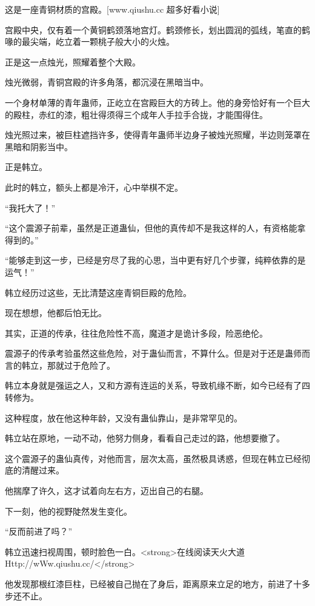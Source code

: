 
\begin{this_body}

这是一座青铜材质的宫殿。[www.qiushu.cc 超多好看小说]

宫殿中央，仅有着一个黄铜鹤颈落地宫灯。鹤颈修长，划出圆润的弧线，笔直的鹤喙的最尖端，屹立着一颗桃子般大小的火烛。

正是这一点烛光，照耀着整个大殿。

烛光微弱，青铜宫殿的许多角落，都沉浸在黑暗当中。

一个身材单薄的青年蛊师，正屹立在宫殿巨大的方砖上。他的身旁恰好有一个巨大的殿柱，赤红的漆，粗壮得须得三个成年人手拉手合拢，才能围得住。

烛光照过来，被巨柱遮挡许多，使得青年蛊师半边身子被烛光照耀，半边则笼罩在黑暗和阴影当中。

正是韩立。

此时的韩立，额头上都是冷汗，心中举棋不定。

“我托大了！”

“这个震源子前辈，虽然是正道蛊仙，但他的真传却不是我这样的人，有资格能拿得到的。”

“能够走到这一步，已经是穷尽了我的心思，当中更有好几个步骤，纯粹依靠的是运气！”

韩立经历过这些，无比清楚这座青铜巨殿的危险。

现在想想，他都后怕无比。

其实，正道的传承，往往危险性不高，魔道才是诡计多段，险恶绝伦。

震源子的传承考验虽然这些危险，对于蛊仙而言，不算什么。但是对于还是蛊师而言的韩立，那就过于危险了。

韩立本身就是强运之人，又和方源有连运的关系，导致机缘不断，如今已经有了四转修为。

这种程度，放在他这种年龄，又没有蛊仙靠山，是非常罕见的。

韩立站在原地，一动不动，他努力侧身，看看自己走过的路，他想要撤了。

这个震源子的蛊仙真传，对他而言，层次太高，虽然极具诱惑，但现在韩立已经彻底的清醒过来。

他揣摩了许久，这才试着向左右方，迈出自己的右腿。

下一刻，他的视野陡然发生变化。

“反而前进了吗？”

韩立迅速扫视周围，顿时脸色一白。<strong>在线阅读天火大道Http://wWw.qiushu.cc/</strong>

他发现那根红漆巨柱，已经被自己抛在了身后，距离原来立足的地方，前进了十多步还不止。


\end{this_body}
